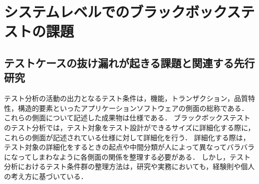 \section{システムレベルでのブラックボックステストの課題} \label{sec:2-2}
\subsection{テストケースの抜け漏れが起きる課題と関連する先行研究}
テスト分析の活動の出力となるテスト条件は，機能，トランザクション，品質特性，構造的要素といったアプリケーションソフトウェアの側面の総称である．
これらの側面について記述した成果物は仕様である．
ブラックボックステストのテスト分析では，テスト対象をテスト設計ができるサイズに詳細化する際に，これらの側面が記述されている仕様に対して詳細化を行う．
詳細化する際は，テスト対象の詳細化をするときの起点や中間分類が人によって異なってバラバラになってしまわなように各側面の関係を整理する必要がある．
しかし，テスト分析におけるテスト条件群の整理方法は，研究や実務においても，経験則や個人の考え方に基づいている．

